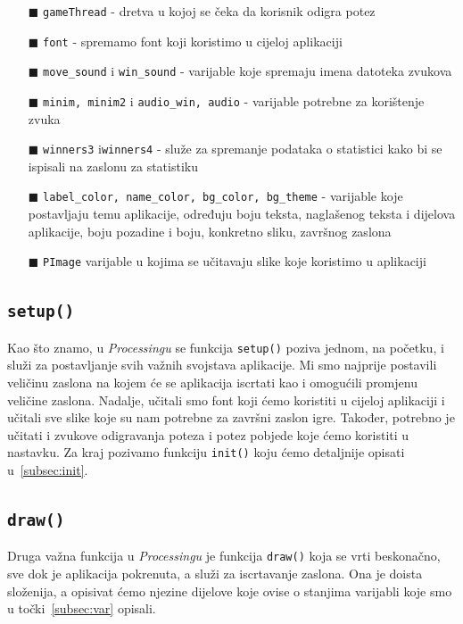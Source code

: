 \documentclass[12pt]{scrartcl}
\begin{document}
\begin{itemize}
    \item[$\blacksquare$] \texttt{gameThread} - dretva u kojoj se čeka da korisnik odigra potez
    \item[$\blacksquare$] \texttt{font} - spremamo font koji koristimo u cijeloj aplikaciji
    \item[$\blacksquare$] \texttt{move\_sound} i \texttt{win\_sound} - varijable koje spremaju imena datoteka zvukova 
    \item[$\blacksquare$] \texttt{minim, minim2} i \texttt{audio\_win, audio} - varijable potrebne za korištenje zvuka
    \item[$\blacksquare$] \texttt{winners3} i\texttt{winners4} - služe za spremanje podataka o statistici kako bi se ispisali na zaslonu za statistiku
    \item[$\blacksquare$] \texttt{label\_color, name\_color, bg\_color, bg\_theme} - varijable koje postavljaju temu aplikacije, određuju boju teksta, naglašenog teksta i dijelova aplikacije, boju pozadine i boju, konkretno sliku, završnog zaslona
    \item[$\blacksquare$] \texttt{PImage} varijable u kojima se učitavaju slike koje koristimo u aplikaciji
    
\end{itemize}

\subsection{\texttt{setup()}}
Kao što znamo, u \textit{Processingu} se funkcija \texttt{setup()} poziva jednom, na početku, i služi za postavljanje svih važnih svojstava aplikacije. Mi smo najprije postavili veličinu zaslona na kojem će se aplikacija iscrtati kao i omogućili promjenu veličine zaslona. Nadalje, učitali smo font koji ćemo koristiti u cijeloj aplikaciji i učitali sve slike koje su nam potrebne za završni zaslon igre. Također, potrebno je učitati i zvukove odigravanja poteza i potez pobjede koje ćemo koristiti u nastavku. Za kraj pozivamo funkciju \texttt{init()} koju ćemo detaljnije opisati u~\ref{subsec:init}.

\subsection{\texttt{draw()}}
Druga važna funkcija u \emph{Processingu} je funkcija \texttt{draw()} koja se vrti beskonačno, sve dok je aplikacija pokrenuta, a služi za iscrtavanje zaslona. Ona je doista složenija, a opisivat ćemo njezine dijelove koje ovise o stanjima varijabli koje smo u točki~\ref{subsec:var} opisali.
\end{document}
